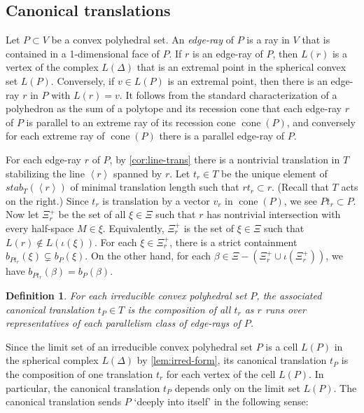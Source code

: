 \documentclass[11pt]{amsart}
\newtheorem{definition}[theorem]{Definition}
\numberwithin{table}{section}
\numberwithin{figure}{section}
\theoremstyle{remark}
\providecommand{\cyc}[1]{\left\langle#1\right\rangle}
\DeclareMathOperator{\cone}{cone}
\begin{document}
\subsection{Canonical translations} \label{sec:endotrans}




Let $P\subset V$ be a convex polyhedral set. An {\em edge-ray} of $P$
is a ray in $V$ that is contained in a 1-dimensional face of $P$. If
$r$ is an edge-ray of $P$, then $L(r)$ is a vertex of the complex
$L(\Delta)$ that is an extremal point in the spherical convex set
$L(P)$. Conversely, if $v\in L(P)$ is an extremal point, then there is
an edge-ray $r$ in $P$ with $L(r) = v$.  It follows from the standard
characterization of a polyhedron as the sum of a polytope and its
recession cone \cite[1.12.ii]{Zieg} that each edge-ray $r$ of $P$ is
parallel to an extreme ray of its recession cone $\cone(P)$, and
conversely for each extreme ray of $\cone(P)$ there is a parallel
edge-ray of $P$.

For each edge-ray $r$ of $P$, by \cref{cor:line-trans} there is a
nontrivial translation in $T$ stabilizing the line $\cyc{r}$ spanned
by $r$. Let $t_r \in T$ be the unique element of $stab_T(\cyc{r})$ of
minimal translation length such that $r t_r\subset r$. (Recall that
$T$ acts on the right.) Since $t_r$ is translation by a vector $v_r$
in $\cone(P)$, we see $P t_r \subset P$. Now let $\Xi_r^+$ be the set
of all $\xi \in \Xi$ such that $r$ has nontrivial intersection with
every half-space $M\in \xi$. Equivalently, $\Xi_r^+$ is the set of
$\xi \in \Xi$ such that $L(r) \notin L(\iota(\xi))$. For each
$\xi \in \Xi_r^+$, there is a strict containment
$b_{P t_r}(\xi)\subsetneq b_P(\xi)$. On the other hand, for each
$\beta \in \Xi - (\Xi_r^+ \cup \iota(\Xi_r^+))$, we have
$b_{P t_r}(\beta) = b_{P}(\beta)$.


\begin{definition}
  For each irreducible convex polyhedral set $P$, the associated {\em
    canonical translation} $t_P\in T$ is the composition of all $t_r$
  as $r$ runs over representatives of each parallelism class of
  edge-rays of $P$.
\end{definition}
Since the limit set of an irreducible convex polyhedral set $P$ is a
cell $L(P)$ in the spherical complex $L(\Delta)$ by \cref{lem:irred-form},
its canonical translation $t_P$ is the composition of one translation
$t_r$ for each vertex of the cell $L(P)$. In particular, the canonical
translation $t_P$ depends only on the limit set $L(P)$. The canonical
translation sends $P$ `deeply into itself' in the following sense:
\end{document}
